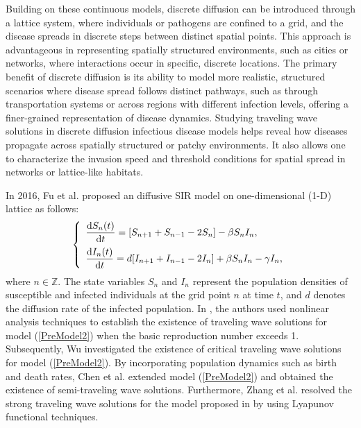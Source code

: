 \documentclass[final,3p,times]{elsarticle}
\numberwithin{equation}{section}
\begin{document}
Building on these continuous models, discrete diffusion can be introduced through a lattice system, where individuals or pathogens are confined to a grid, and the disease spreads in discrete steps between distinct spatial points. This approach is advantageous in representing spatially structured environments, such as cities or networks, where interactions occur in specific, discrete locations. The primary benefit of discrete diffusion is its ability to model more realistic, structured scenarios where disease spread follows distinct pathways, such as through transportation systems or across regions with different infection levels, offering a finer-grained representation of disease dynamics. Studying traveling wave solutions in discrete diffusion infectious disease models helps reveal how diseases propagate across spatially structured or patchy environments. It also allows one to characterize the invasion speed and threshold conditions for spatial spread in networks or lattice-like habitats.

In 2016, Fu et al. \cite{FuGuoWuJNCA2016} proposed an diffusive SIR model on one-dimensional (1-D) lattice as follows:
\begin{equation}
\label{PreModel2}
\left\{
\begin{array}{l}
\vspace{2mm}
\displaystyle  \frac{\textrm{d} S_n(t)}{\textrm{d} t} = [S_{n+1} + S_{n-1} - 2S_n] - \beta S_nI_n, \\
\displaystyle  \frac{\textrm{d} I_n(t)}{\textrm{d} t} = d[I_{n+1} + I_{n-1} - 2I_n] + \beta S_nI_n - \gamma I_n, \\
\end{array}\right.
\end{equation}
where \(n \in \mathds{Z}\). The state variables \(S_n\) and \(I_n\) represent the population densities of susceptible and infected individuals at the grid point \(n\) at time \(t\), and \(d\) denotes the diffusion rate of the infected population. In \cite{FuGuoWuJNCA2016}, the authors used nonlinear analysis techniques to establish the existence of traveling wave solutions for model (\ref{PreModel2}) when the basic reproduction number exceeds 1. Subsequently, Wu \cite{WuJDE2017} investigated the existence of critical traveling wave solutions for model (\ref{PreModel2}). By incorporating population dynamics such as birth and death rates, Chen et al. \cite{ChenGuoHamelNon2017} extended model (\ref{PreModel2}) and obtained the existence of semi-traveling wave solutions. Furthermore, Zhang et al. \cite{ZhangWangLiuJNS2021} resolved the strong traveling wave solutions for the model proposed in \cite{ChenGuoHamelNon2017} by using Lyapunov functional techniques.
\end{document}
